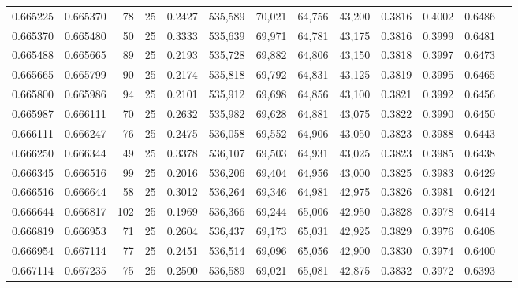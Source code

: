 \begin{tabular}{rrrrrrrrrrrrr}
0.665225 & 0.665370 &    78 &  25 &                                     0.2427 & 535,589 &  70,021 &  64,756 &  43,200 & 0.3816 & 0.4002 & 0.6486 \\
0.665370 & 0.665480 &    50 &  25 &                                     0.3333 & 535,639 &  69,971 &  64,781 &  43,175 & 0.3816 & 0.3999 & 0.6481 \\
0.665488 & 0.665665 &    89 &  25 &                                     0.2193 & 535,728 &  69,882 &  64,806 &  43,150 & 0.3818 & 0.3997 & 0.6473 \\
0.665665 & 0.665799 &    90 &  25 &                                     0.2174 & 535,818 &  69,792 &  64,831 &  43,125 & 0.3819 & 0.3995 & 0.6465 \\
0.665800 & 0.665986 &    94 &  25 &                                     0.2101 & 535,912 &  69,698 &  64,856 &  43,100 & 0.3821 & 0.3992 & 0.6456 \\
0.665987 & 0.666111 &    70 &  25 &                                     0.2632 & 535,982 &  69,628 &  64,881 &  43,075 & 0.3822 & 0.3990 & 0.6450 \\
0.666111 & 0.666247 &    76 &  25 &                                     0.2475 & 536,058 &  69,552 &  64,906 &  43,050 & 0.3823 & 0.3988 & 0.6443 \\
0.666250 & 0.666344 &    49 &  25 &                                     0.3378 & 536,107 &  69,503 &  64,931 &  43,025 & 0.3823 & 0.3985 & 0.6438 \\
0.666345 & 0.666516 &    99 &  25 &                                     0.2016 & 536,206 &  69,404 &  64,956 &  43,000 & 0.3825 & 0.3983 & 0.6429 \\
0.666516 & 0.666644 &    58 &  25 &                                     0.3012 & 536,264 &  69,346 &  64,981 &  42,975 & 0.3826 & 0.3981 & 0.6424 \\
0.666644 & 0.666817 &   102 &  25 &                                     0.1969 & 536,366 &  69,244 &  65,006 &  42,950 & 0.3828 & 0.3978 & 0.6414 \\
0.666819 & 0.666953 &    71 &  25 &                                     0.2604 & 536,437 &  69,173 &  65,031 &  42,925 & 0.3829 & 0.3976 & 0.6408 \\
0.666954 & 0.667114 &    77 &  25 &                                     0.2451 & 536,514 &  69,096 &  65,056 &  42,900 & 0.3830 & 0.3974 & 0.6400 \\
0.667114 & 0.667235 &    75 &  25 &                                     0.2500 & 536,589 &  69,021 &  65,081 &  42,875 & 0.3832 & 0.3972 & 0.6393 \\

\end{tabular}
